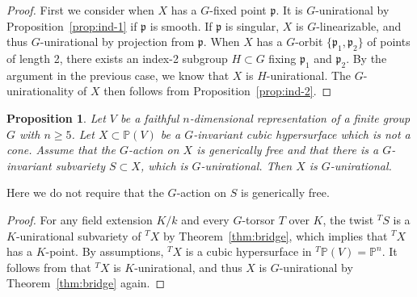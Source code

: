 \documentclass[12pt,reqno]{amsart}
\theoremstyle{plain}
\newtheorem{prop}{Proposition}[section]
\theoremstyle{remark}
\theoremstyle{definition}
\numberwithin{equation}{section}
\def\bP{{\mathbb P}}
\begin{document}
\begin{proof}
First we consider when  $X$ has a $G$-fixed point $\mathfrak p$. It is $G$-unirational by Proposition~\ref{prop:ind-1} if $\mathfrak p$ is smooth. If $\mathfrak p$ is singular, $X$ is $G$-linearizable, and thus $G$-unirational by projection from $\mathfrak p$. When  $X$ has a $G$-orbit $\{\mathfrak p_1,\mathfrak p_2\}$ of points of length 2, there exists an index-2 subgroup $H\subset G$ fixing $\mathfrak p_1$ and $\mathfrak p_2$. By the argument in the previous case, we know that $X$ is $H$-unirational. The $G$-unirationality of $X$ then follows from Proposition~\ref{prop:ind-2}.
\end{proof}



\begin{prop}
\label{prop:cubic-uni-2}
Let $V$ be a faithful $n$-dimensional representation of a finite group $G$ with $n\geq 5$. 
    Let $X\subset \bP(V)$ be a $G$-invariant cubic hypersurface which is not a cone.
    Assume that 
    the $G$-action on $X$ is generically free  and that there is a $G$-invariant subvariety $S\subset X$, which is $G$-unirational. Then $X$ is $G$-unirational. 
\end{prop}

Here we do not require that the $G$-action on $S$ is generically free. 

\begin{proof}
For any field extension $K/k$ and every $G$-torsor $T$ over $K$, the twist $^TS$ is a $K$-unirational subvariety of $^TX$ by Theorem~\ref{thm:bridge}, which implies that $^TX$ has a $K$-point. By assumptions, $^TX$ is a cubic hypersurface in $^T\bP(V)=\bP^n$. It follows from \cite{kollarcubic} that $^TX$ is $K$-unirational, and thus $X$ is $G$-unirational by Theorem~\ref{thm:bridge} again. 

\end{proof}
\end{document}
